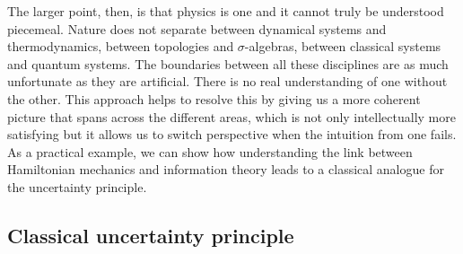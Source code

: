 \documentclass[11pt]{elsarticle}
\begin{document}
The larger point, then, is that physics is one and it cannot truly be understood piecemeal. Nature does not separate between dynamical systems and thermodynamics, between topologies and $\sigma$-algebras, between classical systems and quantum systems. The boundaries between all these disciplines are as much unfortunate as they are artificial. There is no real understanding of one without the other. This approach helps to resolve this by giving us a more coherent picture that spans across the different areas, which is not only intellectually more satisfying but it allows us to switch perspective when the intuition from one fails. As a practical example, we can show how understanding the link between Hamiltonian mechanics and information theory leads to a classical analogue for the uncertainty principle.

\subsection*{Classical uncertainty principle}
\end{document}
